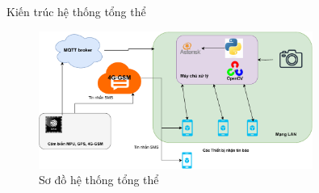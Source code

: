 \begin{frame}{Kiến trúc hệ thống tổng thể}
    \begin{figure}
        \centering
        \includegraphics[width=0.8\textwidth]{images/resuilt_structure_diagram.pdf}
        \caption{Sơ đồ hệ thống tổng thể}
    \end{figure}
\end{frame}

